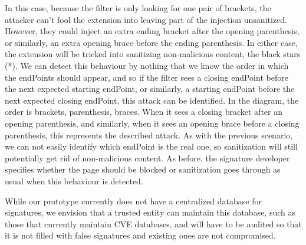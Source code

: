 In this case, because the filter is only looking for one pair of brackets, the attacker can't fool the extension into leaving part of the injection unsanitized. However, they could inject an extra ending bracket after the opening parenthesis, or similarly, an extra opening brace before the ending parenthesis. In either case, the extension will be tricked into sanitizing non-malicious content, the black stars (*). We can detect this behaviour by nothing that we know the order in which the endPoints should appear, and so if the filter sees a closing endPoint before the next expected starting endPoint, or similarly, a starting endPoint before the next expected closing endPoint, this attack can be identified. In the diagram, the order is brackets, parenthesis, braces. When it sees a closing bracket after an opening parenthesis, and similarly, when it sees an opening brace before a closing parenthesis, this represents the described attack. As with the previous scenario, we can not easily identify which endPoint is the real one, so sanitization will still potentially get rid of non-malicious content. As before, the signature developer specifies whether the page should be blocked or sanitization goes through as usual when this behaviour is detected.

While our prototype currently does not have a centralized database for signatures, we envision that a trusted entity can maintain this database, such as those that currently maintain CVE databases, and will have to be audited so that it is not filled with false signatures and existing ones are not compromised.
